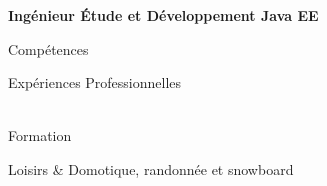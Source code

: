 \documentclass{cv}
\newcommand{\educationdir}{french/education}
\newcommand{\experiencedir}{french/experience}
\newcommand{\skilldir}{french/skill}
\newlength{\firstcolumnwidth}%
\begin{document}


\vspace{0.2cm}

\begin{center}
	\textbf{\huge{Ingénieur Étude et Développement Java EE}}
\end{center}

\vspace{0.2cm}

\begin{rubriquetableau}[\firstcolumnwidth]{Compétences}
	
	
\end{rubriquetableau}

\begin{rubriquetableau}[\firstcolumnwidth]{Expériences Professionnelles}
     \\
	 \\
\end{rubriquetableau}
    
\begin{rubriquetableau}[\firstcolumnwidth]{Formation}
    
    
    
\end{rubriquetableau}

\begin{rubriquetableau}[\firstcolumnwidth]{Loisirs}
	& Domotique, randonnée et snowboard
\end{rubriquetableau}
\end{document}
